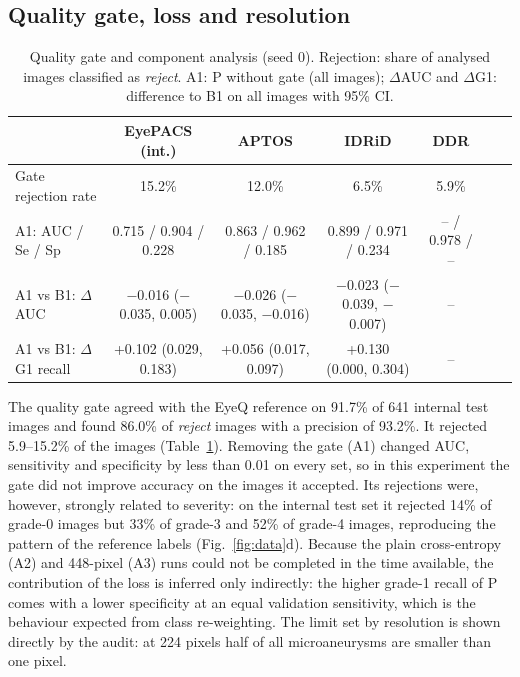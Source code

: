 \subsection{Quality gate, loss and resolution}
\begin{table}[t]
\centering\scriptsize
\caption{Quality gate and component analysis (seed 0). Rejection: share of analysed images classified as \emph{reject}. A1: P without gate (all images); $\Delta$AUC and $\Delta$G1: difference to B1 on all images with 95\% CI.}\label{tab:abl}
\begin{tabular}{@{}lcccccc@{}}
\toprule
 & EyePACS (int.) & APTOS & IDRiD & DDR\\\midrule
Gate rejection rate & 15.2\% & 12.0\% & 6.5\% & 5.9\%\\
A1: AUC / Se / Sp & 0.715 / 0.904 / 0.228 & 0.863 / 0.962 / 0.185 & 0.899 / 0.971 / 0.234 & -- / 0.978 / --\\
A1 vs B1: $\Delta$AUC & $-$0.016 ($-$0.035, 0.005) & $-$0.026 ($-$0.035, $-$0.016) & $-$0.023 ($-$0.039, $-$0.007) & --\\
A1 vs B1: $\Delta$G1 recall & +0.102 (0.029, 0.183) & +0.056 (0.017, 0.097) & +0.130 (0.000, 0.304) & --\\
\bottomrule
\end{tabular}
\end{table}
The quality gate agreed with the EyeQ reference on 91.7\% of 641 internal test images and found 86.0\% of \emph{reject} images with a precision of 93.2\%. It rejected 5.9--15.2\% of the images (Table~\ref{tab:abl}). Removing the gate (A1) changed AUC, sensitivity and specificity by less than 0.01 on every set, so in this experiment the gate did not improve accuracy on the images it accepted. Its rejections were, however, strongly related to severity: on the internal test set it rejected 14\% of grade-0 images but 33\% of grade-3 and 52\% of grade-4 images, reproducing the pattern of the reference labels (Fig.~\ref{fig:data}d). Because the plain cross-entropy (A2) and 448-pixel (A3) runs could not be completed in the time available, the contribution of the loss is inferred only indirectly: the higher grade-1 recall of P comes with a lower specificity at an equal validation sensitivity, which is the behaviour expected from class re-weighting. The limit set by resolution is shown directly by the audit: at 224 pixels half of all microaneurysms are smaller than one pixel.
